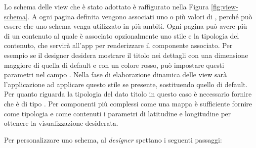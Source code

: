 Lo schema delle view che è stato adottato è raffigurato nella Figura \ref{fig:view-schema}. A ogni pagina definita vengono associati uno o più valori di , perché può essere che uno schema venga utilizzato in più ambiti. Ogni pagina può avere più di un contenuto al quale è associato opzionalmente uno stile e la tipologia del contenuto, che servirà all'app per renderizzare il componente associato. Per esempio se il designer desidera mostrare il titolo nei dettagli con una dimensione maggiore di quella di default e con un colore rosso, può impostare questi parametri nel campo . Nella fase di elaborazione dinamica delle view sarà l'applicazione ad applicare questo stile se presente, sostituendo quello di default. Per quanto riguarda la tipologia del dato titolo in questo caso è necessario fornire che è di tipo . Per componenti più complessi come una mappa è sufficiente fornire come tipologia  e come contenuti i parametri di latitudine e longitudine per ottenere la visualizzazione desiderata.

Per personalizzare uno schema, al \emph{designer} spettano i seguenti passaggi:

